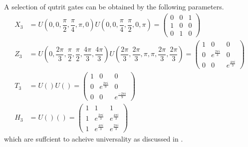A selection of qutrit gates\cite{qudit} can be obtained by the following parameters.\\ 
\begin{equation}
\begin{aligned}
X_3 &= U(0,0,\dfrac{\pi}{2},\dfrac{\pi}{4},\pi,0)U(0,0,\dfrac{\pi}{4},\dfrac{\pi}{2},0,\pi) 
= \begin{pmatrix}
0&0&1
\\
1&0&0
\\
0&1&0
\end{pmatrix}
\\ 
Z_3 &= U(0,\dfrac{2\pi}{3},\dfrac{\pi}{2},\dfrac{\pi}{2},\dfrac{4\pi}{3},\dfrac{4\pi}{3})U(\dfrac{2\pi}{3},\dfrac{2\pi}{3},\pi,\pi,\dfrac{2\pi}{3},\dfrac{2\pi}{3})
= \begin{pmatrix}
1&0&0
\\
0&e^{\frac{2\pi i}{3}}&0
\\
0&0&e^{\frac{4\pi i}{3}}
\end{pmatrix}
\\
T_3 &=U()U() 
= \begin{pmatrix}
1&0&0
\\
0&e^{\frac{2\pi i}{9}}&0
\\
0&0&e^{\frac{-2\pi i}{9}}
\end{pmatrix}
\\
H_3 &= U()() 
= \begin{pmatrix}
1&1&1
\\
1&e^{\frac{2\pi i}{3}}&e^{\frac{4\pi i}{3}}
\\
1&e^{\frac{4\pi i}{3}}&e^{\frac{2\pi i}{3}}
\end{pmatrix}
\end{aligned}
\end{equation}
which are suffcient to acheive universality\cite{qudit} as discussed in .
\\




